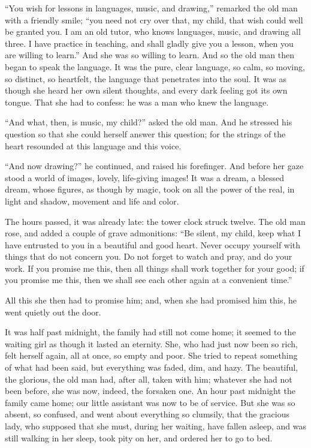 \documentclass[12pt,a4paper]{book}
\begin{document}
``You wish for lessons in languages, music, and drawing,'' remarked the old man with a friendly smile; ``you need not cry over that, my child, that wish could well be granted you. I am an old tutor, who knows languages, music, and drawing all three. I have practice in teaching, and shall gladly give you a lesson, when you are willing to learn.''
And she was so willing to learn. And so the old man then began to speak the language. It was the pure, clear language, so calm, so moving, so distinct, so heartfelt, the language that penetrates into the soul. It was as though she heard her own silent thoughts, and every dark feeling got its own tongue. That she had to confess: he was a man who knew the language.

``And what, then, is music, my child?'' asked the old man. And he stressed his question so that she could herself answer this question; for the strings of the heart resounded at this language and this voice.

``And now drawing?'' he continued, and raised his forefinger. And before her gaze stood a world of images, lovely, life-giving images! It was a dream, a blessed dream, whose figures, as though by magic, took on all the power of the real, in light and shadow, movement and life and color.

The hours passed, it was already late: the tower clock struck twelve. The old man rose, and added a couple of grave admonitions: ``Be silent, my child, keep what I have entrusted to you in a beautiful and good heart. Never occupy yourself with things that do not concern you. Do not forget to watch and pray, and do your work. If you promise me this, then all things shall work together for your good; if you promise me this, then we shall see each other again at a convenient time.''

All this she then had to promise him; and, when she had promised him this, he went quietly out the door.

It was half past midnight, the family had still not come home; it seemed to the waiting girl as though it lasted an eternity. She, who had just now been so rich, felt herself again, all at once, so empty and poor. She tried to repeat something of what had been said, but everything was faded, dim, and hazy. The beautiful, the glorious, the old man had, after all, taken with him; whatever she had not been before, she was now, indeed, the forsaken one.
An hour past midnight the family came home; our little assistant was now to be of service. But she was so absent, so confused, and went about everything so clumsily, that the gracious lady, who supposed that she must, during her waiting, have fallen asleep, and was still walking in her sleep, took pity on her, and ordered her to go to bed.
\end{document}
